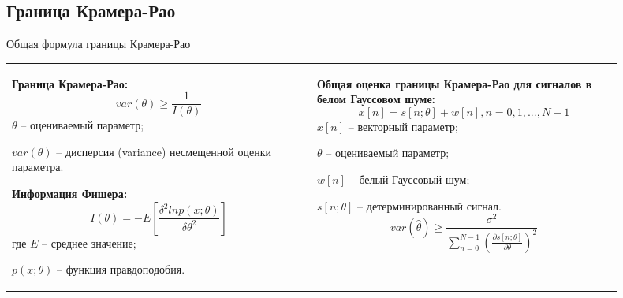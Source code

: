 \subsection{Граница Крамера-Рао}
\begin{frame}{Общая формула границы Крамера-Рао}
\begin{tabular}{m{0.45\linewidth}m{0.45\linewidth}}
\textbf{Граница Крамера-Рао:}
\begin{equation}
\label{eq:equation13}
var(\theta)\geq \frac{1}{I(\theta)}
\end{equation}
$\theta$ – оцениваемый параметр;
		
$var(\theta)$ – дисперсия (variance) несмещенной оценки параметра.

\textbf{Информация Фишера:}
\begin{equation}
	\label{eq:equation14}
	I(\theta) = -E \left[\frac{\delta^2 ln p(x;\theta)}{\delta\theta^2}\right]
\end{equation}
где $E$ – среднее значение;

$p(x;\theta)$ – функция правдоподобия.
&
\textbf{Общая оценка границы Крамера-Рао для сигналов в белом Гауссовом шуме:}
\begin{equation}
	\label{eq:equation14}
x[n] = s[n;\theta] + w[n], n=0,1,...,N-1	
\end{equation}
$x[n]$ -- векторный параметр;

$\theta$  -- оцениваемый параметр;

$w[n]$ -- белый Гауссовый шум;

$s[n;\theta]$ -- детерминированный сигнал.
\begin{equation}
\label{eq:equation14}
var(\hat{\theta}) \geq \frac{\sigma^2}{\displaystyle\sum_{n=0}^{N-1} \left(\frac{\partial s [n; \theta]}{\partial\theta}\right)^2} 
\end{equation}
\end{tabular}
\end{frame}

